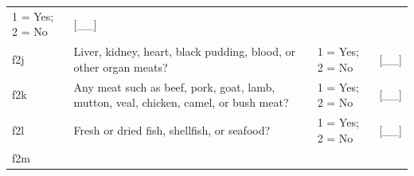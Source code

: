 \documentclass[12pt,a4paper]{book}
\theoremstyle{definition}
\theoremstyle{definition}
\theoremstyle{definition}
\theoremstyle{remark}
\begin{document}
\begin{longtable}[]{@{}llll@{}}
\begin{minipage}[t]{0.25\columnwidth}
1 = Yes; 2 = No\strut
\end{minipage} & \begin{minipage}[t]{0.13\columnwidth}\raggedright
{[}\_\_{]}\strut
\end{minipage}\tabularnewline
\begin{minipage}[t]{0.09\columnwidth}\raggedright
f2j\strut
\end{minipage} & \begin{minipage}[t]{0.41\columnwidth}\raggedright
Liver, kidney, heart, black pudding, blood, or other organ meats?\strut
\end{minipage} & \begin{minipage}[t]{0.25\columnwidth}\raggedright
1 = Yes; 2 = No\strut
\end{minipage} & \begin{minipage}[t]{0.13\columnwidth}\raggedright
{[}\_\_{]}\strut
\end{minipage}\tabularnewline
\begin{minipage}[t]{0.09\columnwidth}\raggedright
f2k\strut
\end{minipage} & \begin{minipage}[t]{0.41\columnwidth}\raggedright
Any meat such as beef, pork, goat, lamb, mutton, veal, chicken, camel,
or bush meat?\strut
\end{minipage} & \begin{minipage}[t]{0.25\columnwidth}\raggedright
1 = Yes; 2 = No\strut
\end{minipage} & \begin{minipage}[t]{0.13\columnwidth}\raggedright
{[}\_\_{]}\strut
\end{minipage}\tabularnewline
\begin{minipage}[t]{0.09\columnwidth}\raggedright
f2l\strut
\end{minipage} & \begin{minipage}[t]{0.41\columnwidth}\raggedright
Fresh or dried fish, shellfish, or seafood?\strut
\end{minipage} & \begin{minipage}[t]{0.25\columnwidth}\raggedright
1 = Yes; 2 = No\strut
\end{minipage} & \begin{minipage}[t]{0.13\columnwidth}\raggedright
{[}\_\_{]}\strut
\end{minipage}\tabularnewline
\begin{minipage}[t]{0.09\columnwidth}\raggedright
f2m\strut
\end{minipage} & \begin{minipage}[t]{0.41\columnwidth}\raggedright

\end{minipage}
\end{longtable}
\end{document}
